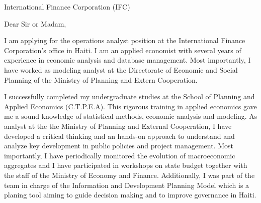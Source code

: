 \documentclass[12pt]{lettre}
\date{11 August, 2020}%
\begin{document}
\begin{letter}{
International Finance Corporation (IFC)
}
\address{
 Alexandro Disla\\
25, carefour Ism\'{e}, impasse F\'{e}n\'{e}lon\\
Pernier 23} 
\nofax{}
\signature{}

 
\opening{Dear Sir or Madam,}

\begin{spacing}{1.5}

I am applying for the operations analyst position at the International Finance Corporation’s office in Haiti. I am an applied economist with several years of experience in economic analysis and database management. Most importantly, I have worked as modeling analyst at the Directorate of Economic and Social Planning of the Ministry of Planning and Extern Cooperation. 

I successfully completed my undergraduate studies at the School of Planning and Applied Economics (C.T.P.E.A). This rigorous training in applied economics gave me a sound knowledge of statistical methods, economic analysis and modeling. As analyst at the the Ministry of Planning and External Cooperation, I have developed  a critical thinking and an hands-on approach to understand and analyze key development in public policies and project management. Most importantly, I have periodically monitored the evolution of macroeconomic aggregates and I have participated in workshops on state budget together with the staff of the Ministry of Economy and Finance. Additionally, I was part of the team in charge of the Information and Development Planning Model which is a planing tool aiming to guide decision making and to improve governance in Haiti.


\end{spacing}
\end{letter}
\end{document}
